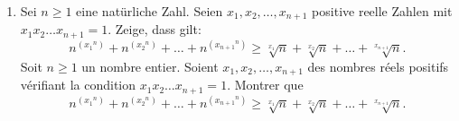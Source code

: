 \documentclass[language=german,style=exam]{smo}
\begin{document}
\begin{enumerate}[label=\textbf{\arabic*.}]
\bigskip\bigskip

\item\translation%
{Sei $n \geq 1$ eine natürliche Zahl. Seien $x_1,x_2,\ldots,x_{n+1}$ positive reelle Zahlen mit $x_1x_2\ldots x_{n+1}=1$. Zeige, dass gilt:
\[
n^{({x_1}^n)}+n^{({x_2}^n)}+\ldots+n^{({x_{n+1}}^n)}\geq \sqrt[{x_1}]{n}+\sqrt[x_2]{n}+\ldots+\sqrt[x_{n+1}]{n}.
\]}
{Soit $n\geq 1$ un nombre entier. Soient $x_1,x_2,\ldots,x_{n+1}$ des nombres réels positifs vérifiant la condition $x_1x_2\ldots x_{n+1}=1$. Montrer que
\[
n^{({x_1}^n)}+n^{({x_2}^n)}+\ldots+n^{({x_{n+1}}^n)}\geq \sqrt[{x_1}]{n}+\sqrt[x_2]{n}+\ldots+\sqrt[x_{n+1}]{n}.
\]}
{}

\end{enumerate}

\bigskip

\vspace{1cm}

\end{document}
